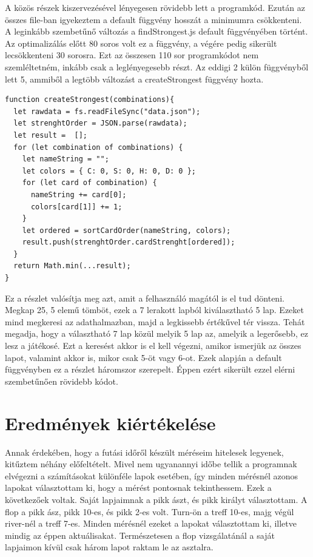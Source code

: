 A közös részek kiszervezésével lényegesen rövidebb lett a programkód. Ezután az összes file-ban igyekeztem a default függvény hosszát a minimumra csökkenteni. A leginkább szembetűnő változás a findStrongest.js default függvényében történt. Az optimalizálás előtt 80 soros volt ez a függvény, a végére pedig sikerült lecsökkenteni 30 sorosra. Ezt az összesen 110 sor programkódot nem szemléltetném, inkább csak a leglényegesebb részt. Az eddigi 2 külön függvényből lett 5, ammiből a legtöbb változást a createStrongest függvény hozta.

\begin{lstlisting}[style=htmlcssjs]
function createStrongest(combinations){
  let rawdata = fs.readFileSync("data.json");
  let strenghtOrder = JSON.parse(rawdata);
  let result =  [];
  for (let combination of combinations) {
    let nameString = "";
    let colors = { C: 0, S: 0, H: 0, D: 0 };
    for (let card of combination) {
      nameString += card[0];
      colors[card[1]] += 1;
    }
    let ordered = sortCardOrder(nameString, colors);
    result.push(strenghtOrder.cardStrenght[ordered]);
  }
  return Math.min(...result);
}
\end{lstlisting}

Ez a részlet valósítja meg azt, amit a felhasználó magától is el tud dönteni. Megkap 25, 5 elemű tömböt, ezek a 7 lerakott lapból kiválasztható 5 lap. Ezeket mind megkeresi az adathalmazban, majd a legkissebb értékűvel tér vissza. Tehát megadja, hogy a választható 7 lap közül melyik 5 lap az, amelyik a legerősebb, ez lesz a játékosé. Ezt a keresést akkor is el kell végezni, amikor ismerjük az összes lapot, valamint akkor is, mikor csak 5-öt vagy 6-ot. Ezek alapján a default függvényben ez a részlet háromszor szerepelt. Éppen ezért sikerült ezzel elérni szembetűnően rövidebb kódot.

\section{Eredmények kiértékelése}
Annak érdekében, hogy a futási időről készült méréseim hitelesek legyenek, kitűztem néhány előfeltételt. Mivel nem ugyanannyi időbe tellik a programnak elvégezni a számításokat különféle lapok esetében, így minden mérésnél azonos lapokat választottam ki, hogy a mérést pontosnak tekinthessem. Ezek a következőek voltak. Saját lapjaimnak a pikk ászt, és pikk királyt választottam. A flop a pikk ász, pikk 10-es, és pikk 2-es volt. Turn-ön a treff 10-es, majg végül river-nél a treff 7-es. Minden mérésnél ezeket a lapokat választottam ki, illetve mindig az éppen aktuálisakat. Természetesen a flop vizsgálatánál a saját lapjaimon kívül csak három lapot raktam le az asztalra.

